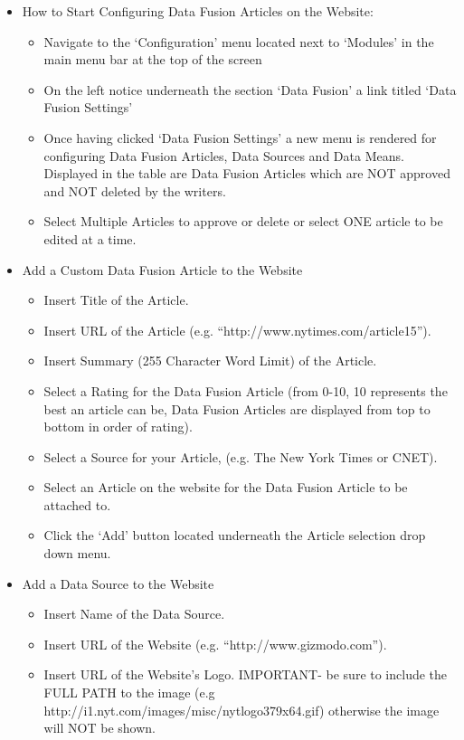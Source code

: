 \documentclass[11pt]{article} %
\begin{document}
\begin{itemize}
\item How to Start Configuring Data Fusion Articles on the Website:
	\begin{itemize}
	\itemindent 10pt
	\item Navigate to the ‘Configuration’ menu located next to ‘Modules’ in the main menu bar at the top of the screen
	\item On the left notice underneath the section ‘Data Fusion’ a link titled ‘Data Fusion Settings’
	\item Once having clicked ‘Data Fusion Settings’ a new menu is rendered for configuring Data Fusion Articles, Data Sources and Data Means. Displayed in the table are Data Fusion Articles which are NOT approved and NOT deleted by the writers.
	\item Select Multiple Articles to approve or delete or select ONE article to be edited at a time.
	\end{itemize}
\item Add a Custom Data Fusion Article to the Website
	\begin{itemize}
	\itemindent 10pt
	\item Insert Title of the Article.
	\item Insert URL of the Article (e.g. “http://www.nytimes.com/article15”).
	\item Insert Summary (255 Character Word Limit) of the Article.
	\item  Select a Rating for the Data Fusion Article (from 0-10, 10 represents the best an article can be, Data Fusion Articles are displayed from top to bottom in order of rating).
	\item Select a Source for your Article, (e.g. The New York Times or CNET).   
	\item Select an Article on the website for the Data Fusion Article to be attached to.
	\item Click the ‘Add’ button located underneath the Article selection drop down menu.
	\end{itemize}
\item Add a Data Source to the Website
	\begin{itemize}
	\itemindent 10pt
	\item Insert Name of the Data Source.
	\item Insert URL of the Website (e.g. “http://www.gizmodo.com”).
	\item Insert URL of the Website’s Logo. IMPORTANT- be sure to include the FULL PATH to the image (e.g http://i1.nyt.com/images/misc/nytlogo379x64.gif) otherwise the image will NOT be shown.

\end{itemize}
\end{itemize}
\end{document}
